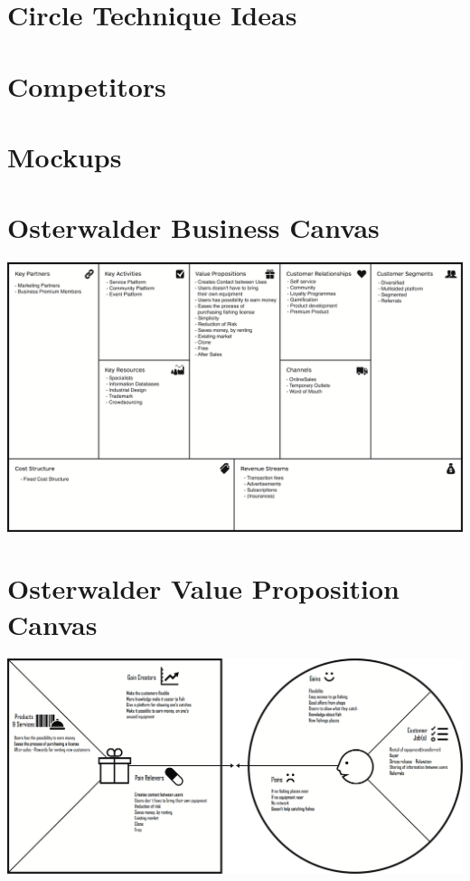 

\begin{appendices}
  \renewcommand\thetable{\thesection}
  \renewcommand\thefigure{\thesection}

	\section{Circle Technique Ideas} \label{app:circ}
		
		\newpage
	
	\section{Competitors} \label{app:comp}
		
		\newpage
		
	\section{Mockups} \label{app:mockups}
		
		\newpage
		
	\section{Osterwalder Business Canvas} \label{app:bcanvas}
	\includegraphics[width=.95\textwidth]{images/business_canvas}
	\newpage

	\section{Osterwalder Value Proposition Canvas} \label{app:vpcanvas}
	\includegraphics[width=.95\textwidth]{images/value_proposition_canvas}
	\newpage
	

\end{appendices}
